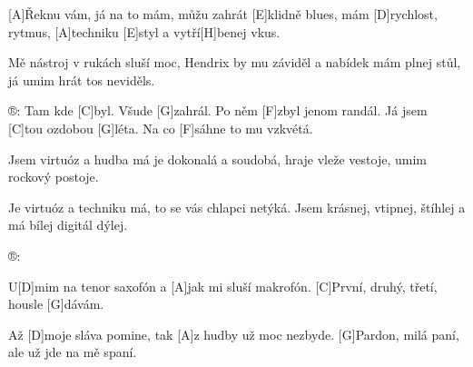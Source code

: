 
[A]\null Řeknu vám, já na to mám,
můžu zahrát [E]klidně blues,
mám [D]rychlost, rytmus, [A]techniku
[E]styl a vytří[H]benej vkus.

Mě nástroj v rukách sluší moc,
Hendrix by mu záviděl
a nabídek mám plnej stůl,
já umim hrát tos neviděls.

®: Tam kde [C]byl. Všude [G]zahrál.
Po něm [F]zbyl jenom randál.
Já jsem [C]tou ozdobou [G]léta.
Na co [F]sáhne to mu vzkvétá.



Jsem virtuóz a hudba má
je dokonalá a soudobá,
hraje vleže vestoje,
umim rockový postoje.

Je virtuóz a techniku má,
to se vás chlapci netýká.
Jsem krásnej, vtipnej, štíhlej
a má bílej digitál dýlej.

®:


U[D]mim na tenor saxofón a [A]jak mi sluší makrofón.
[C]První, druhý, třetí, housle [G]dávám.

Až [D]moje sláva pomine, tak [A]z hudby už moc nezbyde.
[G]Pardon, milá paní,
ale už jde na mě spaní.
